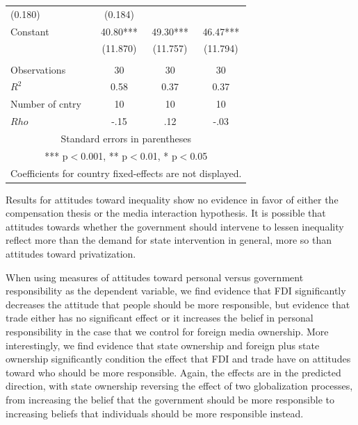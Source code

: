 \documentclass[12pt]{report}
\begin{document}
\begin{table}[htdp]
\begin{center}
{\begin{tabular}{lccc}
(0.180) & (0.184) \\
Constant & 40.80*** & 49.30*** & 46.47*** \\  & (11.870) &
(11.757) & (11.794) \\
 &  &  &
 \\ Observations & 30 & 30 & 30 \\ $R^2$ & 0.58 & 0.37 & 0.37
\\ Number of cntry & 10 & 10 & 10 \\  $Rho$ & -.15 & .12 & -.03 \\ \hline
\multicolumn{4}{c}{ Standard errors in parentheses} \\
\multicolumn{4}{c}{ *** p$<$0.001, ** p$<$0.01, * p$<$0.05} \\
\multicolumn{4}{c}{ Coefficients for country fixed-effects are not displayed.
} \\
\end{tabular}
} \end{center}
\label{default}
\end{table}

Results for attitudes toward inequality show no evidence in favor of either the compensation thesis
or the media interaction hypothesis. It is possible that attitudes towards whether the government
should intervene to lessen inequality reflect more than the demand for state intervention in
general, more so than attitudes toward privatization.

When using measures of attitudes toward personal versus government responsibility as the dependent
variable, we find evidence that FDI significantly decreases the attitude that people should be more
responsible, but evidence that trade either has no significant effect or it increases the belief in
personal responsibility in the case that we control for foreign media ownership. More interestingly,
we find evidence that state ownership and foreign plus state ownership significantly condition the
effect that FDI and trade have on attitudes toward who should be more responsible. Again, the
effects are in the predicted direction, with state ownership reversing the effect of two
globalization processes, from increasing the belief that the government should be more responsible
to increasing beliefs that individuals should be more responsible instead.
\end{document}
